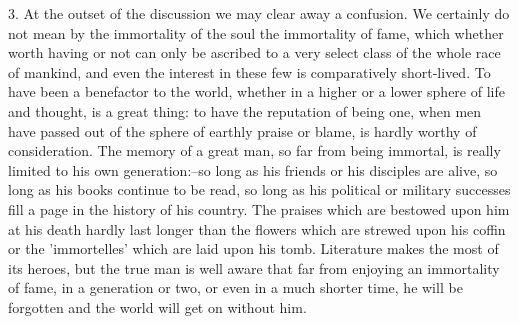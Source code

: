 3. At the outset of the discussion we may clear away a confusion. We
certainly do not mean by the immortality of the soul the immortality of
fame, which whether worth having or not can only be ascribed to a very
select class of the whole race of mankind, and even the interest in
these few is comparatively short-lived. To have been a benefactor to the
world, whether in a higher or a lower sphere of life and thought, is a
great thing: to have the reputation of being one, when men have passed
out of the sphere of earthly praise or blame, is hardly worthy of
consideration. The memory of a great man, so far from being immortal,
is really limited to his own generation:--so long as his friends or his
disciples are alive, so long as his books continue to be read, so long
as his political or military successes fill a page in the history of
his country. The praises which are bestowed upon him at his death hardly
last longer than the flowers which are strewed upon his coffin or the
'immortelles' which are laid upon his tomb. Literature makes the most
of its heroes, but the true man is well aware that far from enjoying an
immortality of fame, in a generation or two, or even in a much shorter
time, he will be forgotten and the world will get on without him.


